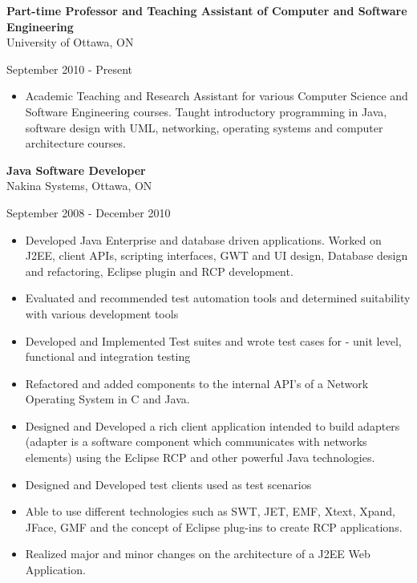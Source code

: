 \documentclass[]{friggeri-cv}
\begin{document}
\textbf{Part-time Professor and Teaching Assistant of Computer and Software Engineering} \\ 
University of Ottawa, ON
\begin{flushright}   
September 2010 - Present \\
\end{flushright}   
\begin{itemize}
\item Academic Teaching and Research Assistant for various Computer Science and Software Engineering courses. Taught introductory programming in Java, software design with UML, networking, operating systems and computer architecture courses.
\end{itemize}


\textbf{Java Software Developer} \\ 
Nakina Systems, Ottawa, ON
\begin{flushright}   
September 2008 - December 2010 \\
\end{flushright}   
\begin{itemize}
\item Developed  Java Enterprise and database driven applications. Worked on J2EE, client APIs, scripting interfaces, GWT and UI design, Database design and refactoring, Eclipse plugin and RCP development.
\item Evaluated and recommended test automation tools and determined suitability with various development tools
\item Developed and Implemented Test suites and wrote test cases for - unit level, functional and integration testing
\item Refactored and added components to the internal API’s of a Network Operating System in C and Java.
\item Designed and Developed a rich client application intended to build adapters (adapter is a software component which communicates with networks elements) using the Eclipse RCP and other powerful Java technologies.
\item Designed and Developed test clients used as test scenarios
\item Able to use different technologies such as SWT, JET, EMF, Xtext, Xpand, JFace, GMF and the concept of Eclipse plug-ins to create RCP applications.
\item Realized major and minor changes on the architecture of a J2EE Web Application.
\end{itemize}
\end{document}
